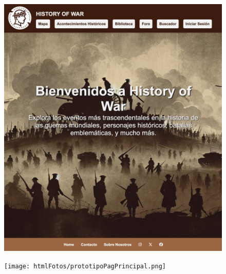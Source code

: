 \documentclass{article}
\begin{document}
\begin{figure}[H]
    \centering
    \begin{minipage}{0.49\textwidth}
        \includegraphics[width=\linewidth]{htmlFotos/pagPrincipal.png}
    \end{minipage}\hfill
    \begin{minipage}{0.49\textwidth}
        \texttt{[image: htmlFotos/prototipoPagPrincipal.png]}
    \end{minipage}
    
    \vspace{5mm}
    

\end{figure}
\end{document}
